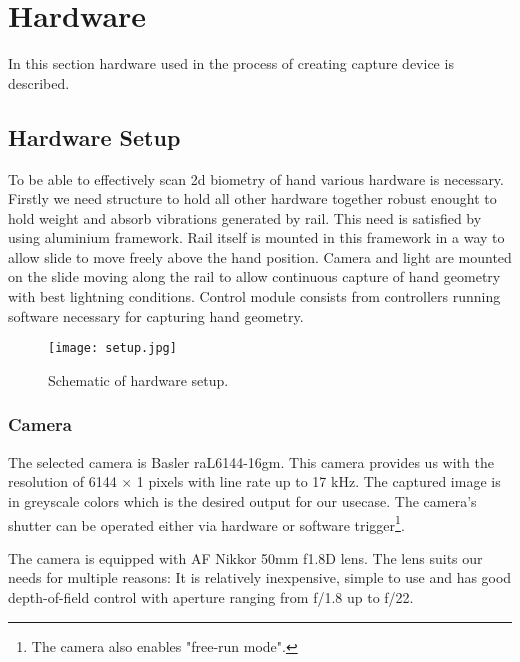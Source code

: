 \section{Hardware}
\label{sec:hw}

In this section hardware used in the process of creating capture device is described.

\subsection{Hardware Setup}
To be able to effectively scan 2d biometry of hand various hardware is necessary. Firstly we need structure to hold all other
hardware together robust enought to hold weight and absorb vibrations generated by rail. This need is satisfied by using aluminium framework.
Rail itself is mounted in this framework in a way to allow slide to move freely above the hand position. Camera and light are mounted on the slide
moving along the rail to allow continuous capture of hand geometry with best lightning conditions.
Control module consists from controllers running software necessary for capturing hand geometry.
\begin{figure}[ht!]
    \label{fig:setup}
    \centering
    \texttt{[image: setup.jpg]}
    \caption{Schematic of hardware setup.}
\end{figure}


\subsubsection*{Camera}
The selected camera is Basler raL6144-16gm. This camera provides us with the resolution of 6144 $\times$ 1 pixels with line rate up to 17 kHz.
The captured image is in greyscale colors which is the desired output for our usecase. The camera's shutter can be operated either via hardware
or software trigger\footnote{The camera also enables "free-run mode".}.

The camera is equipped with AF Nikkor 50mm f1.8D lens. The lens suits our needs for multiple reasons:
It is relatively inexpensive, simple to use and has good depth-of-field control with aperture ranging from f/1.8 up to f/22.

